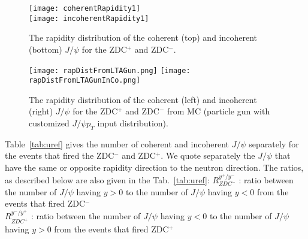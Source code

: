 \begin{figure*}[!Hhtb]
  \begin{center}
    \texttt{[image: coherentRapidity1]}\\
        \texttt{[image: incoherentRapidity1]}


             \caption{
    \label{fig:r5}  
    The rapidity distribution of the coherent (top) and incoherent (bottom) $J/\psi$ for the  ZDC$^{+}$ and ZDC$^{-}$. 
        }
       \end{center}
\end{figure*}


\begin{figure*}[!Hhtb]
  \begin{center}
    \texttt{[image: rapDistFromLTAGun.png]}
        \texttt{[image: rapDistFromLTAGunInCo.png]}


             \caption{
    \label{fig:r6}  
    The rapidity distribution of the coherent (left) and incoherent (right) $J/\psi$ for the  ZDC$^{+}$ and ZDC$^{-}$ from MC (particle gun with customized $J/\psi p_{T}$ input distribution). 
        }
       \end{center}
\end{figure*}

Table~\ref{tab:uref} gives the number of coherent and incoherent $J/\psi$ separately for the events that fired the ZDC$^{-}$ and ZDC$^{+}$. We quote separately the $J/\psi$ that have the same or opposite rapidity direction to the neutron direction. The ratios, as described below are also given in the Tab.~\ref{tab:uref}: 
 $R_{ZDC^{-}}^{y^{+}/y^{-}}$ : ratio between the number of $J/\psi$ having $y>0$ to the number of $J/\psi$ having $y<0$ from the events that fired ZDC$^{-}$\\
$R_{ZDC^{+}}^{y^{-}/y^{+}}$ : ratio between the number of $J/\psi$ having $y<0$ to the number of $J/\psi$ having $y>0$ from the events that fired ZDC$^{+}$\\



